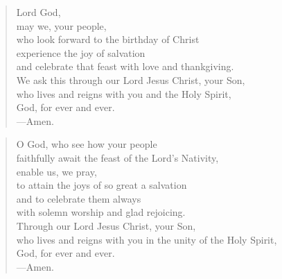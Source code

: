 \prayer

\setlength{\vleftmargin}{\prayerleftmargini}

\begin{verse}
Lord God,\\
may we, your people,\\
who look forward to the birthday of Christ\\
experience the joy of salvation\\
and celebrate that feast with love and thankgiving.\\
We ask this through our Lord Jesus Christ, your Son,\\
who lives and reigns with you and the Holy Spirit,\\
God, for ever and ever.\\
{\color{red}---\thinspace}Amen.
\end{verse}


\begin{verse}
O God, who see how your people\\
faithfully await the feast of the Lord’s Nativity,\\
enable us, we pray,\\
to attain the joys of so great a salvation\\
and to celebrate them always\\
with solemn worship and glad rejoicing.\\
Through our Lord Jesus Christ, your Son,\\
who lives and reigns with you in the unity of the Holy Spirit,\\
God, for ever and ever.\\
{\color{red}---\thinspace}Amen.
\end{verse}

\setlength{\vleftmargin}{\defleftmargini}